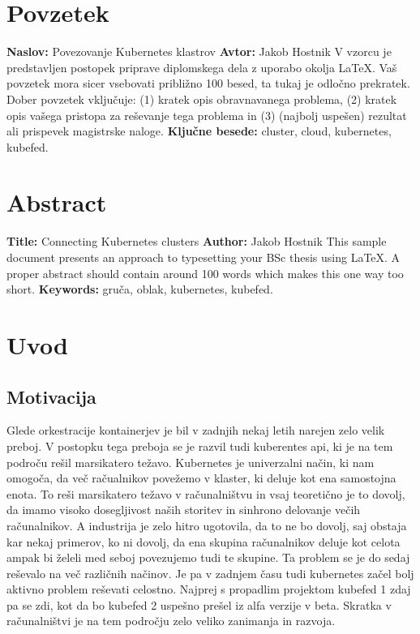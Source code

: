 \documentclass[a4paper, 12pt]{book}
\newcommand{\ttitle}{Povezovanje Kubernetes klastrov}
\newcommand{\ttitleEn}{Connecting Kubernetes clusters}
\newcommand{\tauthor}{Jakob Hostnik}
\newcommand{\tkeywords}{cluster, cloud, kubernetes, kubefed}
\newcommand{\tkeywordsEn}{gruča, oblak, kubernetes, kubefed}
\newcommand{\clearemptydoublepage}{\newpage{\pagestyle{empty}\cleardoublepage}}
\begin{document}
\chapter*{Povzetek}
\noindent\textbf{Naslov:} \ttitle
\bigskip
\noindent\textbf{Avtor:} \tauthor
\bigskip
\noindent V vzorcu je predstavljen postopek priprave diplomskega dela z uporabo okolja \LaTeX. Vaš povzetek mora sicer vsebovati približno 100 besed, ta tukaj je odločno prekratek.
Dober povzetek vključuje: (1) kratek opis obravnavanega problema, (2) kratek opis vašega pristopa za reševanje tega problema in (3) (najbolj uspešen) rezultat ali prispevek magistrske naloge.
\bigskip
\noindent\textbf{Ključne besede:} \tkeywords.
\clearemptydoublepage
\chapter*{Abstract}
\noindent\textbf{Title:} \ttitleEn
\bigskip
\noindent\textbf{Author:} \tauthor
\bigskip
\noindent This sample document presents an approach to typesetting your BSc thesis using \LaTeX. 
A proper abstract should contain around 100 words which makes this one way too short.
\bigskip
\noindent\textbf{Keywords:} \tkeywordsEn.
\clearemptydoublepage
\mainmatter
\setcounter{page}{1}
\pagestyle{fancy}
\chapter{Uvod}
\section{Motivacija}
Glede orkestracije kontainerjev je bil v zadnjih nekaj letih narejen zelo velik preboj. 
V postopku tega preboja se je razvil tudi kuberentes api, ki je na tem področu rešil marsikatero težavo.
Kubernetes  je univerzalni način, ki nam omogoča, da več račualnikov povežemo v klaster, ki deluje kot ena samostojna enota. 
To reši marsikatero težavo v računalništvu in vsaj teoretično je to dovolj, da imamo visoko dosegljivost naših storitev in sinhrono delovanje večih računalnikov.
A industrija je zelo hitro ugotovila, da to ne bo dovolj, saj obstaja kar nekaj primerov, ko ni dovolj, da ena skupina računalnikov deluje kot celota ampak bi želeli med seboj povezujemo tudi te skupine.
Ta problem se je do sedaj reševalo na več različnih načinov.
Je pa v zadnjem času tudi kubernetes začel bolj aktivno problem reševati celostno.
Najprej s propadlim projektom kubefed 1 zdaj pa se zdi, kot da bo kubefed 2 uspešno prešel iz alfa verzije v beta.
Skratka v računalništvi je na tem področju zelo veliko zanimanja in razvoja.
\end{document}
